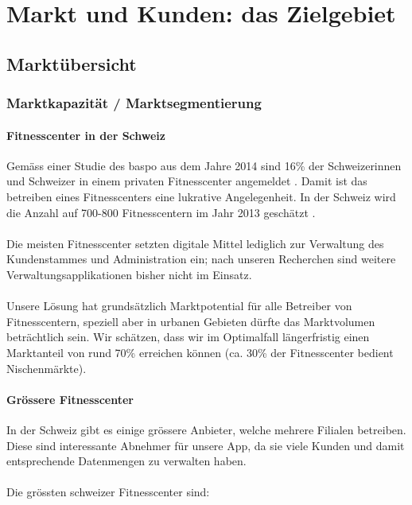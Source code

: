 \clearpage
\section{Markt und Kunden: das Zielgebiet}

\subsection{Marktübersicht}

\subsubsection{Marktkapazität / Marktsegmentierung}\label{sec:marktkapazitat}

\paragraph{Fitnesscenter in der Schweiz}
Gemäss einer Studie des \gls{baspo} aus dem Jahre 2014 sind 16\% der Schweizerinnen und Schweizer in einem privaten Fitnesscenter angemeldet \cite{schweizer+fitness}. Damit ist das betreiben eines Fitnesscenters eine lukrative Angelegenheit. In der Schweiz wird die Anzahl auf 700-800 Fitnesscentern im Jahr 2013 geschätzt \cite{fitness-studios+1+milliarde}\cite{fitness+tribune}. \\ \\
Die meisten Fitnesscenter setzten digitale Mittel lediglich zur Verwaltung des Kundenstammes und Administration ein; nach unseren Recherchen sind weitere Verwaltungsapplikationen bisher nicht im Einsatz. \\ \\
Unsere Lösung hat grundsätzlich Marktpotential für alle Betreiber von Fitnesscentern, speziell aber in urbanen Gebieten dürfte das Marktvolumen beträchtlich sein. Wir schätzen, dass wir im Optimalfall längerfristig einen Marktanteil von rund 70\% erreichen können (ca. 30\% der Fitnesscenter bedient Nischenmärkte).

\paragraph{Grössere Fitnesscenter}
In der Schweiz gibt es einige grössere Anbieter, welche mehrere Filialen betreiben. Diese sind interessante Abnehmer für unsere App, da sie viele Kunden und damit entsprechende Datenmengen zu verwalten haben.
\\ \\
Die grössten schweizer Fitnesscenter sind\cite{fitness+tribune}:

